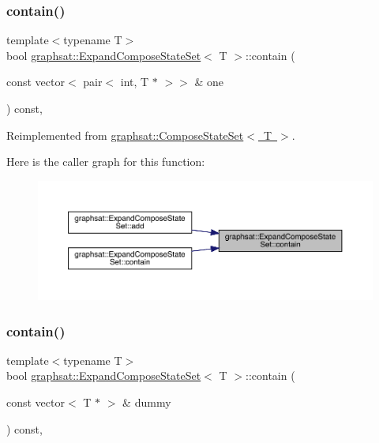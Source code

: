 \subsubsection{\texorpdfstring{contain()}{contain()}\hspace{0.1cm}{\footnotesize\ttfamily [1/2]}}
{\footnotesize\ttfamily template$<$typename T$>$ \\
bool \mbox{\hyperlink{classgraphsat_1_1_expand_compose_state_set}{graphsat\+::\+Expand\+Compose\+State\+Set}}$<$ T $>$\+::contain (\begin{DoxyParamCaption}\item[{const vector$<$ pair$<$ int, T $\ast$ $>$$>$ \&}]{one }\end{DoxyParamCaption}) const\hspace{0.3cm}{\ttfamily [inline]}, {\ttfamily [virtual]}}



Reimplemented from \mbox{\hyperlink{classgraphsat_1_1_compose_state_set_abfd0e46ca8319f69a506b7854850782b}{graphsat\+::\+Compose\+State\+Set$<$ T $>$}}.

Here is the caller graph for this function\+:\nopagebreak
\begin{figure}[H]
\begin{center}
\leavevmode
\includegraphics[width=350pt]{classgraphsat_1_1_expand_compose_state_set_a4c014106669978321e07e0c9b7783479_icgraph}
\end{center}
\end{figure}
\mbox{\label{classgraphsat_1_1_expand_compose_state_set_a5a2ee34354897e737fff3162fd25d791}} 
\subsubsection{\texorpdfstring{contain()}{contain()}\hspace{0.1cm}{\footnotesize\ttfamily [2/2]}}
{\footnotesize\ttfamily template$<$typename T$>$ \\
bool \mbox{\hyperlink{classgraphsat_1_1_expand_compose_state_set}{graphsat\+::\+Expand\+Compose\+State\+Set}}$<$ T $>$\+::contain (\begin{DoxyParamCaption}\item[{const vector$<$ T $\ast$ $>$ \&}]{dummy }\end{DoxyParamCaption}) const\hspace{0.3cm}{\ttfamily [inline]}, {\ttfamily [private]}}

